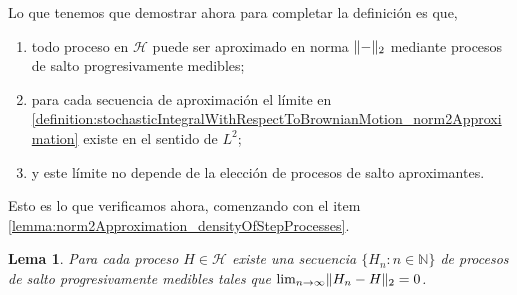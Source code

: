 \documentclass{report}
\newcommand{\placeholderParameter}{-}
\newcommand{\naturalNumbers}{\mathbb{N}}
\DeclarePairedDelimiter{\norm}{\|}{\|}
\theoremstyle{plain}
\newtheorem{lemma}{Lema}
\theoremstyle{remark}
\theoremstyle{definition}
\begin{document}
Lo que tenemos que demostrar ahora para completar la definición es que,
\begin{enumerate}
  \item
  \label{lemma:norm2Approximation_densityOfStepProcesses}
  todo proceso en \(\mathcal{H}\) puede ser aproximado en norma 
  \(\norm{\placeholderParameter}_2\) 
  mediante procesos de salto progresivamente medibles;
  \item
  \label{lemma:norm2Approximation_sequenceConvergence}
  para cada secuencia de aproximación el límite en \eqref{definition:stochasticIntegralWithRespectToBrownianMotion_norm2Approximation} existe en el sentido de \(L^2\);
  \item
  \label{lemma:norm2Approximation_limitUniqueness}
  y este límite no depende de la elección de procesos de salto aproximantes.
\end{enumerate} 
Esto es lo que verificamos ahora, comenzando con el item \ref{lemma:norm2Approximation_densityOfStepProcesses}.
\begin{lemma}
  Para cada proceso \(H \in \mathcal{H}\) existe una secuencia \(\{H_n : n \in \naturalNumbers\}\) de procesos de salto progresivamente medibles tales que \(\lim_{n \rightarrow \infty} \norm{H_n - H}_2 = 0\).
\end{lemma}
\end{document}
